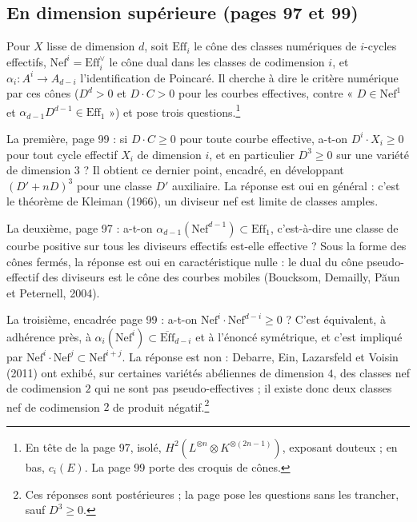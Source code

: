 \documentclass[11pt,a4paper]{article}
\begin{document}
\subsection*{En dimension supérieure (pages 97 et 99)}

Pour $X$ lisse de dimension $d$, soit $\mathrm{Eff}_{i}$ le cône des classes
numériques de $i$-cycles effectifs, $\mathrm{Nef}^{i} = \mathrm{Eff}_{i}^{\vee}$
le cône dual dans les classes de codimension $i$, et $\alpha_{i} \colon A^{i}
\to A_{d-i}$ l'identification de Poincaré. Il cherche à dire le critère
numérique par ces cônes ($D^{d} > 0$ et $D \cdot C > 0$ pour les courbes
effectives, contre « $D \in \mathrm{Nef}^{1}$ et $\alpha_{d-1}D^{d-1} \in
\mathrm{Eff}_{1}$ ») et pose trois questions.\footnote{En tête de la page 97,
isolé, $H^{2}(L^{\otimes n} \otimes K^{\otimes(2n-1)})$, exposant douteux ; en
bas, $c_{i}(E)$. La page 99 porte des croquis de cônes.}

La première, page 99 : si $D \cdot C \geqslant 0$ pour toute courbe effective,
a-t-on $D^{i}\cdot X_{i} \geqslant 0$ pour tout cycle effectif $X_{i}$ de
dimension $i$, et en particulier $D^{3} \geqslant 0$ sur une variété de dimension
$3$ ? Il obtient ce dernier point, encadré, en développant $(D' + nD)^{3}$ pour
une classe $D'$ auxiliaire. La réponse est oui en général : c'est le théorème
de Kleiman (1966), un diviseur nef est limite de classes amples.

La deuxième, page 97 : a-t-on $\alpha_{d-1}(\mathrm{Nef}^{d-1}) \subset
\mathrm{Eff}_{1}$, c'est-à-dire une classe de courbe positive sur tous les
diviseurs effectifs est-elle effective ? Sous la forme des cônes fermés, la
réponse est oui en caractéristique nulle : le dual du cône pseudo-effectif des
diviseurs est le cône des courbes mobiles (Boucksom, Demailly, Păun et
Peternell, 2004).

La troisième, encadrée page 99 : a-t-on $\mathrm{Nef}^{i} \cdot
\mathrm{Nef}^{d-i} \geqslant 0$ ? C'est équivalent, à adhérence près, à
$\alpha_{i}(\mathrm{Nef}^{i}) \subset \overline{\mathrm{Eff}}_{d-i}$ et à
l'énoncé symétrique, et c'est impliqué par $\mathrm{Nef}^{i} \cdot
\mathrm{Nef}^{j} \subset \mathrm{Nef}^{i+j}$. La réponse est non : Debarre, Ein,
Lazarsfeld et Voisin (2011) ont exhibé, sur certaines variétés abéliennes de
dimension $4$, des classes nef de codimension $2$ qui ne sont pas
pseudo-effectives ; il existe donc deux classes nef de codimension $2$ de
produit négatif.\footnote{Ces réponses sont postérieures ; la page pose les
questions sans les trancher, sauf $D^{3} \geqslant 0$.}
\end{document}
